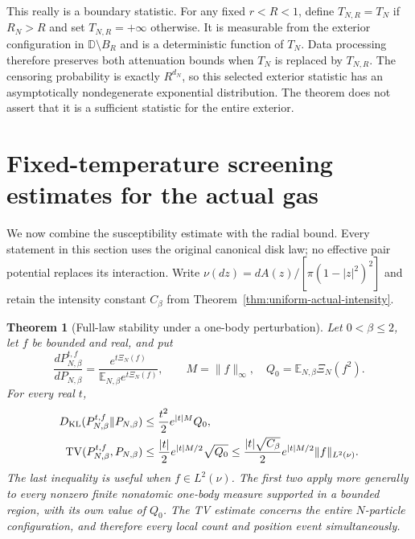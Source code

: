\documentclass[11pt]{article}
\newcommand{\D}{\mathbb D}
\DeclareMathOperator{\TV}{TV}
\newtheorem{theorem}{Theorem}[section]
\theoremstyle{remark}\newtheorem{remark}[theorem]{Remark}
\begin{document}
This really is a boundary statistic. For any fixed $r<R<1$, define
$T_{N,R}=T_N$ if $R_N>R$ and set $T_{N,R}=+\infty$ otherwise.
It is measurable from the exterior configuration in $\D\setminus B_R$
and is a deterministic function of $T_N$. Data processing therefore
preserves both attenuation bounds when $T_N$ is replaced by $T_{N,R}$.
The censoring probability is exactly $R^{d_N}$, so this selected
exterior statistic has an asymptotically nondegenerate exponential
distribution. The theorem does not assert that it is a sufficient
statistic for the entire exterior.


\section{Fixed-temperature screening estimates for the actual gas}
\label{sec:actual-screening}

We now combine the susceptibility estimate with the radial bound.
Every statement in this section uses the original canonical disk law;
no effective pair potential replaces its interaction. Write
$\nu(dz)=dA(z)/[\pi(1-|z|^2)^2]$ and retain the intensity constant
$C_\beta$ from Theorem~\ref{thm:uniform-actual-intensity}.

\begin{theorem}[Full-law stability under a one-body perturbation]
\label{thm:actual-tilt-TV}
Let $0<\beta\le2$, let $f$ be bounded and real, and put
\[
 \frac{dP_{N,\beta}^{t,f}}{dP_{N,\beta}}
 =\frac{e^{t\Xi_N(f)}}{\mathbb E_{N,\beta}e^{t\Xi_N(f)}},
 \qquad M=\|f\|_\infty,\quad
 Q_0=\mathbb E_{N,\beta}\Xi_N(f^2).
\]
For every real $t$,
\begin{align}
 D_{\rm KL}(P_{N,\beta}^{t,f}\Vert P_{N,\beta})
 &\le\frac{t^2}{2}e^{|t|M}Q_0,
 \label{eq:actual-tilt-KL}\\
 \TV(P_{N,\beta}^{t,f},P_{N,\beta})
 &\le\frac{|t|}{2}e^{|t|M/2}\sqrt{Q_0}
 \le\frac{|t|\sqrt{C_\beta}}2 e^{|t|M/2}\|f\|_{L^2(\nu)}.
 \label{eq:actual-tilt-TV}
\end{align}
The last inequality is useful when $f\in L^2(\nu)$. The first two
apply more generally to every nonzero finite nonatomic one-body measure
supported in a bounded region, with
its own value of $Q_0$. The TV estimate concerns the entire
$N$-particle configuration, and therefore every local count and
position event simultaneously.
\end{theorem}
\end{document}
